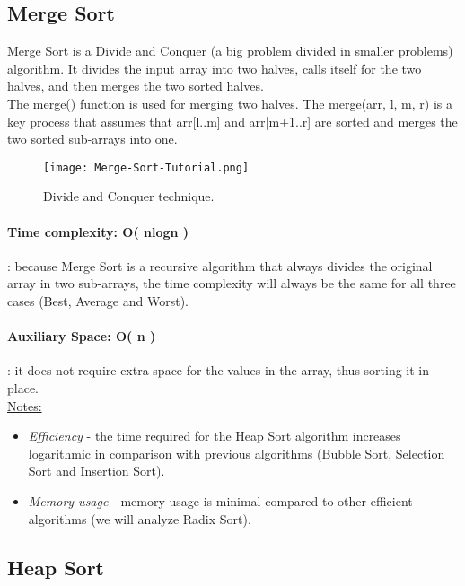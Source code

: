 \documentclass{article}
\begin{document}
\subsection{Merge Sort}

Merge Sort is a Divide and Conquer (a big problem divided in smaller problems)
algorithm. It divides the input array into two halves, calls itself for the two halves, and
then merges the two sorted halves.\hfill \break \\
The merge() function is used for merging two halves. The merge(arr, l, m, r) is a key
process that assumes that arr[l..m] and arr[m+1..r] are sorted and merges the two
sorted sub-arrays into one.


\begin{figure}[h!]
\centering
\texttt{[image: Merge-Sort-Tutorial.png]}
\caption{\label{fig:MergeSort} Divide and Conquer technique.}
\end{figure}



\paragraph{Time complexity: O( nlogn )}: because Merge Sort is a recursive algorithm that always divides the original array in two sub-arrays, the time complexity will always be the same for all three cases (Best, Average and Worst).

\paragraph{Auxiliary Space: O( n )}: it does not require extra space for the values in the array, thus sorting it in place.\hfill \break \\


\noindent\underline{Notes:}
\begin{itemize}
    \item \emph{Efficiency} - the time required for the Heap Sort algorithm increases logarithmic in comparison with previous algorithms (Bubble Sort, Selection Sort and Insertion Sort).
    \item \emph{Memory usage} - memory usage is minimal compared to other efficient algorithms (we will analyze Radix Sort).
\end{itemize}




\subsection{Heap Sort}
\end{document}
